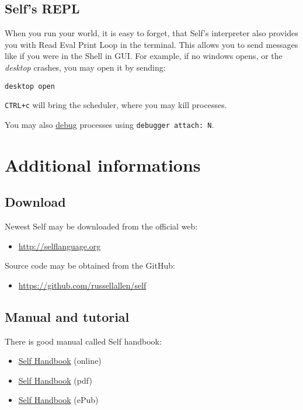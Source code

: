 \documentclass[10pt]{article}
\begin{document}
\begin{multicols*}{3}
\subsection{Self's REPL}
When you run your world, it is easy to forget, that Self's interpreter also provides you with Read Eval Print Loop in the terminal. This allows you to send messages like if you were in the Shell in GUI. For example, if no windows opens, or the \textit{desktop} crashes, you may open it by sending:

\begin{lstlisting}
desktop open
\end{lstlisting}

\texttt{CTRL+c} will bring the scheduler, where you may kill processes.

You may also \href{http://handbook.selflanguage.org/4.5/textdebug.html}{debug} processes using \texttt{debugger\ attach:\ N}.




\vfill
\columnbreak
\section{Additional informations}



\subsection{Download}
Newest Self may be downloaded from the official web:

\begin{itemize}[noitemsep]
\item \url{http://selflanguage.org}
\end{itemize}

Source code may be obtained from the GitHub:

\begin{itemize}[noitemsep]
\item \url{https://github.com/russellallen/self}
\end{itemize}



\subsection{Manual and tutorial}
There is good manual called Self handbook:

\begin{itemize}[noitemsep]
\item \href{http://handbook.selflanguage.org/4.5/}{Self Handbook} (online)
\item \href{https://dl.dropboxusercontent.com/u/11891854/tmp/ebooks/Self/SelfHandbook.pdf}{Self Handbook} (pdf)
\item \href{https://dl.dropboxusercontent.com/u/11891854/tmp/ebooks/Self/SelfHandbook.epub}{Self Handbook} (ePub)
\end{itemize}


\end{multicols*}
\end{document}
